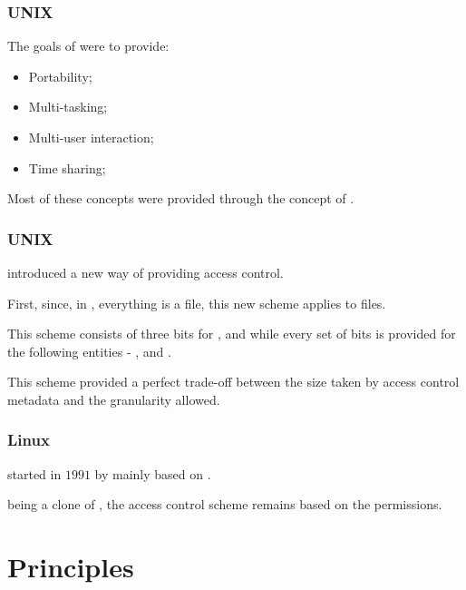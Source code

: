 
\begin{frame}
  \frametitle{UNIX}

  The goals of  were to provide:

  \begin{itemize}
    \item
      Portability;
    \item
      Multi-tasking;
    \item
      Multi-user interaction;
    \item
      Time sharing;
  \end{itemize}

  \-

  Most of these concepts were provided through the concept of .
\end{frame}


\begin{frame}
  \frametitle{UNIX}

   introduced a new way of providing access control.

  \-

  First, since, in , everything is a file, this new scheme applies
  to files.

  \-

  This scheme consists of three bits  for , 
  and  while every set of bits is provided for the following
  entities  - ,  and .

  \-

  This scheme provided a perfect trade-off between the size taken by access
  control metadata and the granularity allowed.
\end{frame}


\begin{frame}
  \frametitle{Linux}

   started in $1991$ by  mainly based on
  .

  \-

   being a clone of , the access control scheme
  remains based on the  permissions.
\end{frame}

%
%

\section{Principles}

